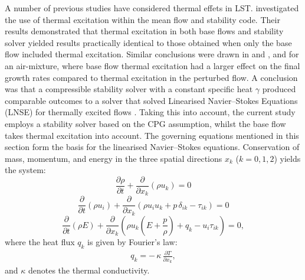 A number of previous studies have considered thermal effets in \gls{LST}. \cite{Wartemann2019} investigated the use of thermal excitation within the mean flow and stability code. Their results demonstrated that thermal excitation in both base flows and stability solver yielded results practically identical to those obtained when only the base flow included thermal excitation. Similar conclusions were drawn in \cite{MortensenZhong2013} and \cite{miromiroThesis}, and \cite{BitterShepherd2015} for an air-mixture, where base flow thermal excitation had a larger effect on the final growth rates compared to thermal excitation in the perturbed flow. A conclusion was that a compressible stability solver with a constant specific heat $\gamma$ produced comparable outcomes to a solver that solved Linearised Navier--Stokes Equations (LNSE) for thermally excited flows \citep{Wartemann2019}. Taking this into account, the current study employs a stability solver based on the \gls{CPG} assumption, whilst the base flow takes thermal excitation into account. The governing equations mentioned in this section form the basis for the linearised Navier--Stokes equations. Conservation of mass, momentum, and energy in the three spatial directions $x_k$ ($k = 0, 1, 2$) yields the system:
\begin{equation}
    \frac{\partial \rho}{\partial t} + \frac{\partial}{\partial x_k}\!\left(\rho u_k\right) = 0
\end{equation} \begin{equation}
    \frac{\partial}{\partial t}\!\left(\rho u_i\right)
+ \frac{\partial}{\partial x_k}\!\left(\rho u_i u_k + p\,\delta_{ik} - \tau_{ik}\right) = 0
\end{equation} \begin{equation}
    \frac{\partial}{\partial t}\!\left(\rho E\right)
+ \frac{\partial}{\partial x_k}\!\left(
  \rho u_k\!\left(E + \frac{p}{\rho}\right) + q_k - u_i \tau_{ik}
\right) = 0,
\end{equation}
where the heat flux $q_k$ is given by Fourier's law:
\begin{align}
q_k = -\,\kappa\,\frac{\partial T}{\partial x_k},
\end{align}
and $\kappa$ denotes the thermal conductivity.

